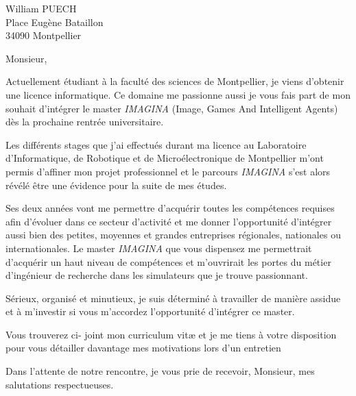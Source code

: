 \documentclass{lettre}
\begin{document}
\begin{letter}{William PUECH\\Place Eugène Bataillon\\34090 Montpellier}

\date{\today}
\address{14 chemin des condamines\\34660 Cournonterral}
\notelephone
\nofax
\signature{Rémi \textsc{Cérès}}

\opening{Monsieur,}

Actuellement étudiant à la faculté des sciences de Montpellier, je viens d’obtenir une licence informatique.  Ce domaine me passionne  aussi je vous fais part de mon souhait d'intégrer le master \emph{IMAGINA} (Image, Games And Intelligent Agents) dès la prochaine rentrée universitaire.

Les différents stages que j’ai effectués durant ma licence au Laboratoire d’Informatique, de Robotique et de Microélectronique de Montpellier m’ont permis d’affiner mon projet professionnel et le parcours \emph{IMAGINA} s'est alors révélé être une évidence pour la suite de mes études.

Ses deux années vont me permettre d’acquérir toutes les compétences requises afin d’évoluer dans ce secteur d’activité et me donner l’opportunité d’intégrer aussi bien des petites, moyennes et grandes entreprises régionales, nationales ou internationales.
Le master \emph{IMAGINA} que vous dispensez me permettrait d'acquérir un haut niveau de compétences et m'ouvrirait les portes du métier d'ingénieur de recherche dans les simulateurs que je trouve passionnant.

Sérieux, organisé et minutieux, je suis déterminé à travailler de manière assidue et à m’investir si vous m’accordez l’opportunité d’intégrer  ce master.

Vous trouverez ci- joint mon curriculum vitæ et je me tiens à votre disposition pour vous détailler davantage mes motivations lors d'un entretien


\closing{Dans l’attente de notre rencontre, je vous prie de recevoir, Monsieur, mes salutations respectueuses.}

\end{letter}
\end{document}
